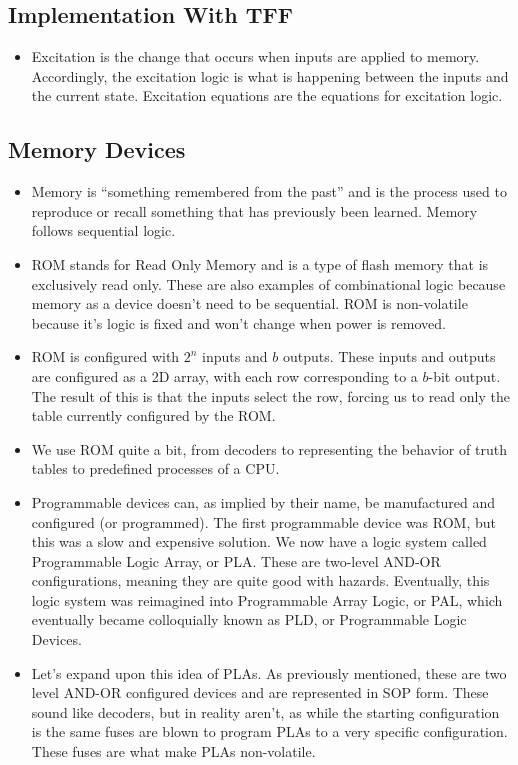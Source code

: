\documentclass[10pt,a4paper]{article}
\begin{document}
\subsection{Implementation With TFF}
\begin{itemize}
\item Excitation is the change that occurs when inputs are applied to memory. Accordingly, the excitation logic is what is happening between the inputs and the current state. Excitation equations are the equations for excitation logic. 
\end{itemize}
\subsection{Memory Devices}
\begin{itemize}
\item Memory is ``something remembered from the past'' and is the process used to reproduce or recall something that has previously been learned. Memory follows sequential logic.
\item ROM stands for Read Only Memory and is a type of flash memory that is exclusively read only. These are also examples of combinational logic because memory as a device doesn't need to be sequential. ROM is non-volatile because it's logic is fixed and won't change when power is removed. 
\item ROM is configured with $2^n$ inputs and $b$ outputs. These inputs and outputs are configured as a 2D array, with each row corresponding to a $b$-bit output. The result of this is that the inputs select the row, forcing us to read only the table currently configured by the ROM. 
\item We use ROM quite a bit, from decoders to representing the behavior of truth tables to predefined processes of a CPU.
\item Programmable devices can, as implied by their name, be manufactured and configured (or programmed). The first programmable device was ROM, but this was a slow and expensive solution. We now have a logic system called Programmable Logic Array, or PLA. These are two-level AND-OR configurations, meaning they are quite good with hazards. Eventually, this logic system was reimagined into Programmable Array Logic, or PAL, which eventually became colloquially known as PLD, or Programmable Logic Devices.
\item Let's expand upon this idea of PLAs. As previously mentioned, these are two level AND-OR configured devices and are represented in SOP form. These sound like decoders, but in reality aren't, as while the starting configuration is the same fuses are blown to program PLAs to a very specific configuration. These fuses are what make PLAs non-volatile. 

\end{itemize}
\end{document}
